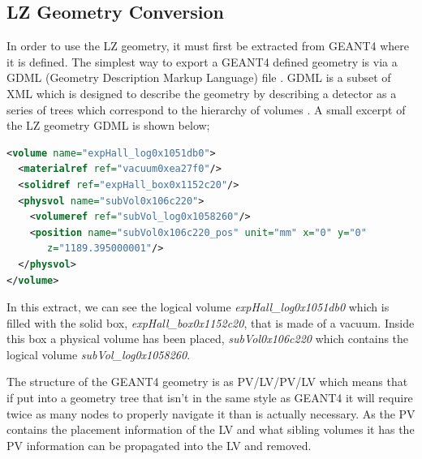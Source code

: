 \subsection{LZ Geometry Conversion}
\par
In order to use the LZ geometry, it must first be extracted from GEANT4 where it is defined.
The simplest way to export a GEANT4 defined geometry is via a GDML (Geometry Description Markup Language) file \cite{GDML_USER_GUIDE_ref}.
GDML is a subset of XML which is designed to describe the geometry by describing a detector as a series of trees which correspond to the hierarchy of volumes \cite{GDML_USER_GUIDE_ref}.
A small excerpt of the LZ geometry GDML is shown below;
\begin{lstlisting}[backgroundcolor=\color{lightgrey},
                   language=XML, xleftmargin = 0.5cm]
<volume name="expHall_log0x1051db0">
  <materialref ref="vacuum0xea27f0"/>
  <solidref ref="expHall_box0x1152c20"/>
  <physvol name="subVol0x106c220">
    <volumeref ref="subVol_log0x1058260"/>
    <position name="subVol0x106c220_pos" unit="mm" x="0" y="0"
       z="1189.395000001"/>
  </physvol>
</volume>
\end{lstlisting}
In this extract, we can see the logical volume \textit{expHall\_log0x1051db0} which is filled with the solid box, \textit{expHall\_box0x1152c20}, that is made of a vacuum.
Inside this box a physical volume has been placed, \textit{subVol0x106c220} which contains the logical volume \textit{subVol\_log0x1058260}.
\par
The structure of the GEANT4 geometry is as PV/LV/PV/LV which means that if put into a geometry tree that isn't in the same style as GEANT4 it will require twice as many nodes to properly navigate it than is actually necessary.
As the PV contains the placement information of the LV and what sibling volumes it has the PV information can be propagated into the LV and removed.

